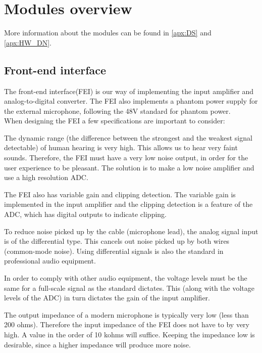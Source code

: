 
\section{Modules overview}
More information about the modules can be found in \autoref{apx:DS} and \ref{apx:HW_DN}. 

\subsection{Front-end interface}
The front-end interface(FEI) is our way of implementing the input amplifier and analog-to-digital converter. The FEI  also implements a phantom power supply for the external microphone, following the 48V standard for phantom power. \\
When designing the FEI a few specifications are important to consider: 

The dynamic range (the difference between the strongest and the weakest signal detectable) of human hearing is very high. This allows us to hear very faint sounds. Therefore, the FEI must have a very low noise output, in order for the user experience to be pleasant. The solution is to make a low noise amplifier and use a high resolution ADC. 

The FEI also has variable gain and clipping detection. The variable gain is implemented in the input amplifier and the clipping detection is a feature of the ADC, which has digital outputs to indicate clipping. 

To reduce noise picked up by the cable (microphone lead), the analog signal input is of the differential type. This cancels out noise picked up by both wires (common-mode noise). Using differential signals is also the standard in professional audio equipment. 

In order to comply with other audio equipment, the voltage levels must be the same for a full-scale signal as the standard dictates. This (along with the voltage levels of the ADC) in turn dictates the gain of the input amplifier. 

The output impedance of a modern microphone is typically very low (less than 200 ohms). Therefore the input impedance of the FEI does not have to by very high. A value in the order of 10 kohms will suffice. Keeping the impedance low is desirable, since a higher impedance will produce more noise. 


